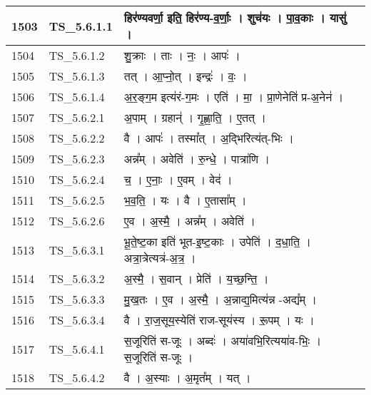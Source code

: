 \documentclass[17pt]{extarticle}
\begin{document}
\begin{longtable}{||p{0.4in}||p{0.9in}||p{4.0in}||p{0.9in}||}
        \hline
            1503 & TS\_5.6.1.1 & हिर॑ण्यवर्णा॒ इति॒ हिर॑ण्य{-}व॒र्णाः॒   ।   शुच॑यः   ।   पा॒व॒काः   ।   यासु॑   ।    &      \\
        \hline
            1504 & TS\_5.6.1.2 & शु॒क्राः   ।   ताः   ।   नः॒   ।   आपः॑   ।    &      \\
        \hline
            1505 & TS\_5.6.1.3 & तत्   ।   आ॒प्नो॒त्   ।   इन्द्रः॑   ।   वः॒   ।    &      \\
        \hline
            1506 & TS\_5.6.1.4 & अ॒र॒ङ्ग॒म इत्य॑रं{-}ग॒मः   ।   एति॑   ।   मा॒   ।   प्रा॒णेनेति॑ प्र{-}अ॒नेन॑   ।    &      \\
        \hline
            1507 & TS\_5.6.2.1 & अ॒पाम्   ।   ग्रहान्॑   ।   गृ॒ह्णा॒ति॒   ।   ए॒तत्   ।    &      \\
        \hline
            1508 & TS\_5.6.2.2 & वै   ।   आपः॑   ।   तस्मा᳚त्   ।   अ॒द्भिरित्य॑त्{-}भिः   ।    &      \\
        \hline
            1509 & TS\_5.6.2.3 & अन्न᳚म्   ।   अवेति॑   ।   रु॒न्धे॒   ।   पात्रा॑णि   ।    &      \\
        \hline
            1510 & TS\_5.6.2.4 & च॒   ।   ए॒नाः॒   ।   ए॒वम्   ।   वेद॑   ।    &      \\
        \hline
            1511 & TS\_5.6.2.5 & भ॒व॒ति॒   ।   यः   ।   वै   ।   ए॒तासा᳚म्   ।    &      \\
        \hline
            1512 & TS\_5.6.2.6 & ए॒व   ।   अ॒स्मै॒   ।   अन्न᳚म्   ।   अवेति॑   ।    &      \\
        \hline
            1513 & TS\_5.6.3.1 & भू॒ते॒ष्ट॒का इति॑ भूत{-}इ॒ष्ट॒काः   ।   उपेति॑   ।   द॒धा॒ति॒   ।   अत्रा॒त्रेत्यत्र॑{-}अ॒त्र॒   ।    &      \\
        \hline
            1514 & TS\_5.6.3.2 & अ॒स्मै॒   ।   स॒वान्   ।   प्रेति॑   ।   य॒च्छ॒न्ति॒   ।    &      \\
        \hline
            1515 & TS\_5.6.3.3 & मु॒ख॒तः   ।   ए॒व   ।   अ॒स्मै॒   ।   अ॒न्नाद्य॒मित्य॑न्न {-}अद्य᳚म्   ।    &      \\
        \hline
            1516 & TS\_5.6.3.4 & वै   ।   रा॒ज॒सूय॒स्येति॑ राज{-}सूय॑स्य   ।   रू॒पम्   ।   यः   ।    &      \\
        \hline
            1517 & TS\_5.6.4.1 & स॒जूरिति॑ स{-}जूः   ।   अब्दः॑   ।   अया॑वभि॒रित्यया॑व{-}भिः॒   ।   स॒जूरिति॑ स{-}जूः   ।    &      \\
        \hline
            1518 & TS\_5.6.4.2 & वै   ।   अ॒स्याः   ।   अ॒मृत᳚म्   ।   यत्   ।    &      \\

\end{longtable}
\end{document}
